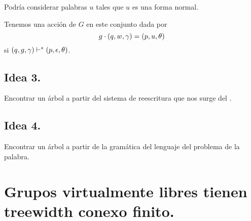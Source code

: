 \documentclass[12pt]{article}
\begin{document}
	Podría considerar palabras $u$ tales que $u$ es una forma normal.
	
	\begin{afirmacion}
		Tenemos una acción de $G$ en este conjunto dada por 
		\[
			g \cdot (q, w, \gamma) = (p,u,\theta) 
		\]
	si $(q,g,\gamma) \vdash^{*} (p,\epsilon,\theta)$.
	\end{afirmacion}


\subsection{Idea 3.}
	Encontrar un árbol a partir del sistema de reescritura que nos surge del \APND.

\subsection{Idea 4.}
	Encontrar un árbol a partir de la gramática del lenguaje del problema de la palabra.


\section{Grupos virtualmente libres tienen treewidth conexo finito.}

\section{}
\end{document}
